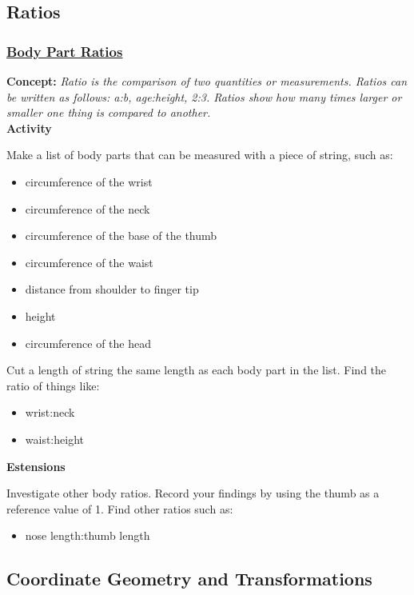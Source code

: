 	\subsection{Ratios} \label{classactsratio}
	
		\subsubsection{\underline{Body Part Ratios}}
	\textbf{Concept:} \emph{Ratio is the comparison of two quantities or measurements. Ratios can be written as follows: a:b, age:height, 2:3. Ratios show how many times larger or smaller one thing is compared to another.	}\\
	
	\noindent \textbf{Activity}
	
	\noindent Make a list of body parts that can be measured with a piece of string, such as:
	\begin{itemize}
	\item circumference of the wrist
	\item circumference of the neck
	\item circumference of the base of the thumb
	\item circumference of the waist
	\item distance from shoulder to finger tip
	\item height
	\item circumference of the head
	\end{itemize}
	
	\noindent Cut a length of string the same length as each body part in the list. Find the ratio of things like:
	\begin{itemize}
	\item wrist:neck
	\item waist:height
	\end{itemize}

\noindent \textbf{Estensions}

\noindent Investigate other body ratios. Record your findings by using the thumb as a reference value of 1. Find other ratios such as:
\begin{itemize}
\item nose length:thumb length
\end{itemize}	

	\subsection{Coordinate Geometry and Transformations} \label{classactscoordgeo}			
